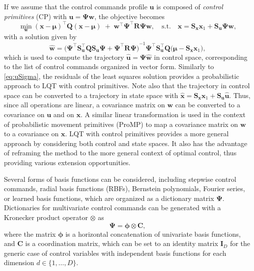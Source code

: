 \documentclass[10pt,a4paper]{article} %
\newcommand{\trsp}{{\scriptscriptstyle\top}}
\begin{document}
If we assume that the control commands profile $\bm{u}$ is composed of \emph{control primitives} (CP) with $\bm{u}=\bm{\Psi}\bm{w}$, the objective becomes
\begin{equation*}
	\min_{\bm{w}} {(\bm{x}-\bm{\mu})}^{\!\trsp}
	\bm{Q} 
	(\bm{x}-\bm{\mu})
	\;+\;
	\bm{w}^{\!\trsp} \bm{\Psi}^{\!\trsp} \bm{R} \bm{\Psi} \bm{w},
	\quad\text{s.t.}\quad
	\bm{x}=\bm{S}_{\bm{x}}\bm{x}_1+\bm{S}_{\bm{u}} \bm{\Psi} \bm{w},
\end{equation*}
with a solution given by
\begin{equation*}
	\bm{\hat{w}} = {\big(\bm{\Psi}^{\!\trsp}  \bm{S}_{\bm{u}}^\trsp \bm{Q} \bm{S}_{\bm{u}} \bm{\Psi} + \bm{\Psi}^{\!\trsp} \bm{R} \bm{\Psi}  \big)}^{-1}
	\bm{\Psi}^{\!\trsp} \bm{S}_{\bm{u}}^\trsp \bm{Q} \big(\bm{\mu} - \bm{S}_{\bm{x}} \bm{x}_1 \big),
\end{equation*}
which is used to compute the trajectory $\bm{\hat{u}}=\bm{\Psi}\bm{\hat{w}}$ in control space, corresponding to the list of control commands organized in vector form. Similarly to \eqref{eq:uSigma}, the residuals of the least squares solution provides a probabilistic approach to LQT with control primitives. Note also that the trajectory in control space can be converted to a trajectory in state space with $\bm{\hat{x}}=\bm{S}_{\bm{x}}\bm{x}_1+\bm{S}_{\bm{u}}\bm{\hat{u}}$. Thus, since all operations are linear, a covariance matrix on $\bm{w}$ can be converted to a covariance on $\bm{u}$ and on $\bm{x}$. A similar linear transformation is used in the context of probabilistic movement primitives (ProMP) \cite{Paraschos13} to map a covariance matrix on $\bm{w}$ to a covariance on $\bm{x}$. LQT with control primitives provides a more general approach by considering both control and state spaces. It also has the advantage of reframing the method to the more general context of optimal control, thus providing various extension opportunities.

Several forms of basis functions can be considered, including stepwise control commands, radial basis functions (RBFs), Bernstein polynomials, Fourier series, or learned basis functions, which are organized as a dictionary matrix $\bm{\Psi}$. Dictionaries for multivariate control commands can be generated with a Kronecker product operator $\otimes$ as
\begin{equation} 
	\bm{\Psi} = \bm{\phi} \otimes \bm{C},
	\label{eq:Psi2}
\end{equation}
where the matrix $\bm{\phi}$ is a horizontal concatenation of univariate basis functions, and $\bm{C}$ is a coordination matrix, which can be set to an identity matrix $\bm{I}_D$ for the generic case of control variables with independent basis functions for each dimension $d\in\{1,\ldots,D\}$.
\end{document}

